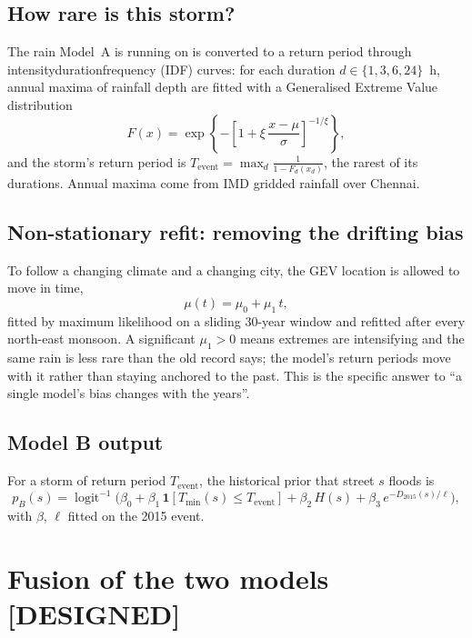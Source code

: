 \documentclass[11pt,a4paper]{article}
\newcommand{\planned}{\textcolor{planned}{\small\textbf{[DESIGNED]}}}
\begin{document}
\subsection{How rare is this storm?}
The rain Model~A is running on is converted to a return period through
intensity\textendash duration\textendash frequency (IDF) curves: for each duration
$d \in \{1, 3, 6, 24\}$~h, annual maxima of rainfall depth are fitted with a
Generalised Extreme Value distribution
\begin{equation}
  F(x) = \exp\!\left\{-\left[1+\xi\,\frac{x-\mu}{\sigma}\right]^{-1/\xi}\right\},
\end{equation}
and the storm's return period is $T_{\text{event}} = \max_d \frac{1}{1-F_d(x_d)}$, the
rarest of its durations. Annual maxima come from IMD gridded rainfall over Chennai.

\subsection{Non-stationary refit: removing the drifting bias}
\label{sec:nonstationary}
To follow a changing climate and a changing city, the GEV location is allowed to move
in time,
\begin{equation}
  \mu(t) = \mu_0 + \mu_1\, t ,
\end{equation}
fitted by maximum likelihood on a sliding 30-year window and refitted after every
north-east monsoon. A significant $\mu_1 > 0$ means extremes are intensifying and the
same rain is less rare than the old record says; the model's return periods move with
it rather than staying anchored to the past. This is the specific answer to ``a single
model's bias changes with the years''.

\subsection{Model B output}
For a storm of return period $T_{\text{event}}$, the historical prior that street $s$
floods is
\begin{equation}
  p_B(s) = \operatorname{logit}^{-1}\!\big(\beta_0 + \beta_1\,\mathbf{1}[T_{\min}(s)\le T_{\text{event}}]
          + \beta_2\,H(s) + \beta_3\, e^{-D_{2015}(s)/\ell}\big),
\end{equation}
with $\beta$, $\ell$ fitted on the 2015 event.

\section{Fusion of the two models \planned}
\label{sec:fusion}
\end{document}
